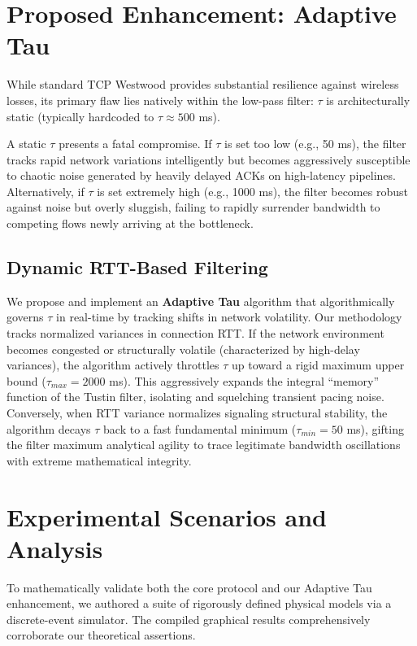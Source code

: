 \documentclass[conference,10pt,a4paper]{IEEEtran}
\begin{document}
\section{Proposed Enhancement: Adaptive Tau}

While standard TCP Westwood provides substantial resilience against wireless losses, its primary flaw lies natively within the low-pass filter: $\tau$ is architecturally static (typically hardcoded to $\tau \approx 500$ ms). 

A static $\tau$ presents a fatal compromise. If $\tau$ is set too low (e.g., 50 ms), the filter tracks rapid network variations intelligently but becomes aggressively susceptible to chaotic noise generated by heavily delayed ACKs on high-latency pipelines. Alternatively, if $\tau$ is set extremely high (e.g., 1000 ms), the filter becomes robust against noise but overly sluggish, failing to rapidly surrender bandwidth to competing flows newly arriving at the bottleneck.

\subsection{Dynamic RTT-Based Filtering}
We propose and implement an \textbf{Adaptive Tau} algorithm that algorithmically governs $\tau$ in real-time by tracking shifts in network volatility. Our methodology tracks normalized variances in connection RTT. 
If the network environment becomes congested or structurally volatile (characterized by high-delay variances), the algorithm actively throttles $\tau$ up toward a rigid maximum upper bound ($\tau_{max} = 2000$ ms). This aggressively expands the integral ``memory'' function of the Tustin filter, isolating and squelching transient pacing noise. Conversely, when RTT variance normalizes signaling structural stability, the algorithm decays $\tau$ back to a fast fundamental minimum ($\tau_{min} = 50$ ms), gifting the filter maximum analytical agility to trace legitimate bandwidth oscillations with extreme mathematical integrity.

\section{Experimental Scenarios and Analysis}

To mathematically validate both the core protocol and our Adaptive Tau enhancement, we authored a suite of rigorously defined physical models via a discrete-event simulator. The compiled graphical results comprehensively corroborate our theoretical assertions.
\end{document}
